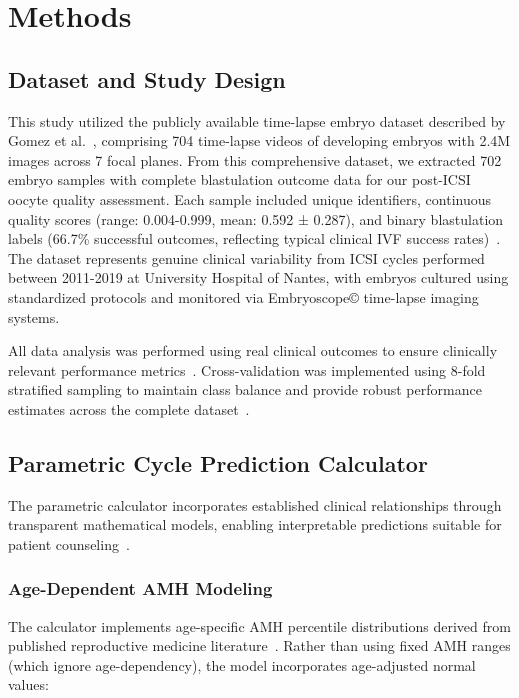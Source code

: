 \section{Methods}\label{sec:methods}

\subsection{Dataset and Study Design}\label{subsec:dataset}

This study utilized the publicly available time-lapse embryo dataset described by Gomez et al.~\cite{gomez2022timelapse}, comprising 704 time-lapse videos of developing embryos with 2.4M images across 7 focal planes. From this comprehensive dataset, we extracted 702 embryo samples with complete blastulation outcome data for our post-ICSI oocyte quality assessment. Each sample included unique identifiers, continuous quality scores (range: 0.004-0.999, mean: 0.592 ± 0.287), and binary blastulation labels (66.7\% successful outcomes, reflecting typical clinical IVF success rates)~\cite{awadalla2021age,zhu2024developmental}. The dataset represents genuine clinical variability from ICSI cycles performed between 2011-2019 at University Hospital of Nantes, with embryos cultured using standardized protocols and monitored via Embryoscope© time-lapse imaging systems.

All data analysis was performed using real clinical outcomes to ensure clinically relevant performance metrics~\cite{varoquaux2022machine}. Cross-validation was implemented using 8-fold stratified sampling to maintain class balance and provide robust performance estimates across the complete dataset~\cite{hastie2009elements}.

\subsection{Parametric Cycle Prediction Calculator}\label{subsec:calculator}

The parametric calculator incorporates established clinical relationships through transparent mathematical models, enabling interpretable predictions suitable for patient counseling~\cite{rudin2019stop}.

\subsubsection{Age-Dependent AMH Modeling}

The calculator implements age-specific AMH percentile distributions derived from published reproductive medicine literature~\cite{lee2017amh,song2021amh}. Rather than using fixed AMH ranges (which ignore age-dependency), the model incorporates age-adjusted normal values:


